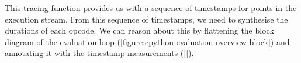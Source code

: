 


This tracing function provides us with a sequence of timestamps for points in the execution stream.
From this sequence of timestamps, we need to synthesise the durations of each opcode.
We can reason about this by flattening the block diagram of the evaluation loop (\autoref{figure:cpython-evaluation-overview-block}) and annotating it with the timestamp measurements (\autoref{}).


